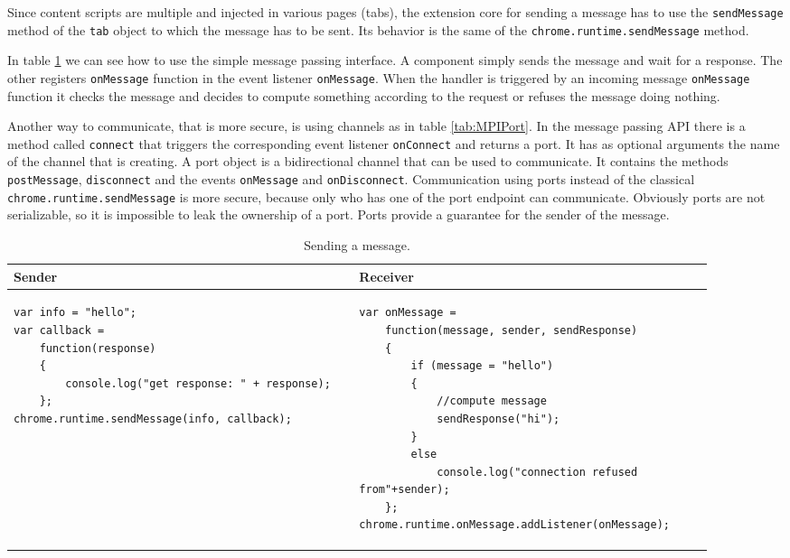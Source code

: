 Since content scripts are multiple and injected in various pages (tabs), the extension core for sending a message has to use the \texttt{sendMessage} method of the \texttt{tab} object to which the message has to be sent. Its behavior is the same of the \texttt{chrome.runtime.sendMessage} method.

In table \ref{tab:MPIMessage} we can see how to use the simple message passing interface. A component simply sends the message and wait for a response. The other registers \texttt{onMessage} function in the event listener \texttt{onMessage}. When the handler is triggered by an incoming message \texttt{onMessage} function it checks the message and decides to compute something according to the request or refuses the message doing nothing.

Another way to communicate, that is more secure, is using channels as in table \ref{tab:MPIPort}. In the message passing API there is a method called \texttt{connect} that triggers the corresponding event listener \texttt{onConnect} and returns a port. It has as optional arguments the name of the channel that is creating. A port object is a bidirectional channel that can be used to communicate. It contains the methods \texttt{postMessage}, \texttt{disconnect} and the events \texttt{onMessage} and \texttt{onDisconnect}. Communication using ports instead of the classical \texttt{chrome.runtime.sendMessage} is more secure, because only who has one of the port endpoint can communicate. Obviously ports are not serializable, so it is impossible to leak the ownership of a port. Ports provide a guarantee for the sender of the message.

\lstset{language=java,showstringspaces=false}
\begin{table}[htb]
\begin{small}
\begin{center}
\begin{tabular}{p{0.45\linewidth} | p{0.45\linewidth}}
Sender & Receiver\\
\hline
\begin{lstlisting} 
var info = "hello";
var callback = 
	function(response) 
	{ 
		console.log("get response: " + response);
	};
chrome.runtime.sendMessage(info, callback);
\end{lstlisting}&
\begin{lstlisting} 
var onMessage = 
	function(message, sender, sendResponse) 
	{ 
		if (message = "hello") 
		{
		    //compute message
			sendResponse("hi");
		}
		else 
			console.log("connection refused from"+sender);
	};
chrome.runtime.onMessage.addListener(onMessage);
\end{lstlisting}\\
\end{tabular}
\end{center}
\end{small}
\caption{Sending a message.}
\label{tab:MPIMessage}
\end{table}

